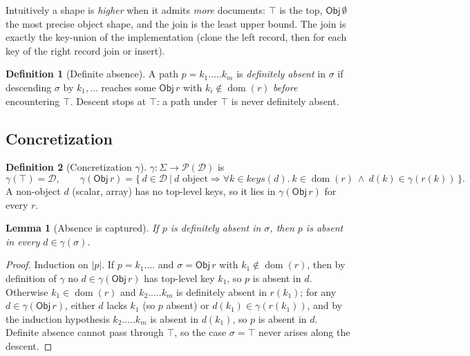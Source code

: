\documentclass[11pt]{article}
\newcommand{\dom}{\operatorname{dom}}
\newcommand{\Obj}{\mathsf{Obj}}
\theoremstyle{plain}
\newtheorem{lemma}{Lemma}
\theoremstyle{definition}
\newtheorem{definition}{Definition}
\theoremstyle{remark}
\begin{document}
\noindent Intuitively a shape is \emph{higher} when it admits \emph{more} documents: $\top$
is the top, $\Obj\,\emptyset$ the most precise object shape, and the join is the least upper
bound. The join is exactly the key-union of the implementation (clone the left record, then
for each key of the right record join or insert).

\begin{definition}[Definite absence]
A path $p=k_1.\dots.k_m$ is \emph{definitely absent} in $\sigma$ if descending $\sigma$ by
$k_1,\dots$ reaches some $\Obj\,r$ with $k_i\notin\dom(r)$ \emph{before} encountering $\top$.
Descent stops at $\top$: a path under $\top$ is never definitely absent.
\end{definition}

\subsection{Concretization}

\begin{definition}[Concretization $\gamma$]\label{def:gamma}
$\gamma:\Sigma\to\mathcal{P}(\mathcal{D})$ is
\[
  \gamma(\top)=\mathcal{D},\qquad
  \gamma(\Obj\,r)=\bigl\{\,d\in\mathcal{D}\ \big|\ d \text{ object} \Rightarrow
  \forall k\in\mathit{keys}(d).\ k\in\dom(r)\ \wedge\ d(k)\in\gamma(r(k))\,\bigr\}.
\]
A non-object $d$ (scalar, array) has no top-level keys, so it lies in $\gamma(\Obj\,r)$ for
every $r$.
\end{definition}

\begin{lemma}[Absence is captured]\label{lem:absence}
If $p$ is definitely absent in $\sigma$, then $p$ is absent in every $d\in\gamma(\sigma)$.
\end{lemma}
\begin{proof}
Induction on $|p|$. If $p=k_1.\dots$ and $\sigma=\Obj\,r$ with $k_1\notin\dom(r)$, then by
definition of $\gamma$ no $d\in\gamma(\Obj\,r)$ has top-level key $k_1$, so $p$ is absent in
$d$. Otherwise $k_1\in\dom(r)$ and $k_2.\dots.k_m$ is definitely absent in $r(k_1)$; for any
$d\in\gamma(\Obj\,r)$, either $d$ lacks $k_1$ (so $p$ absent) or $d(k_1)\in\gamma(r(k_1))$,
and by the induction hypothesis $k_2.\dots.k_m$ is absent in $d(k_1)$, so $p$ is absent in
$d$. Definite absence cannot pass through $\top$, so the case $\sigma=\top$ never arises along
the descent.
\end{proof}
\end{document}
